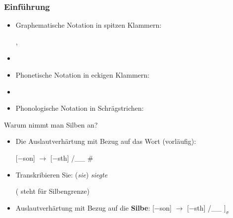 


\begin{frame}
\frametitle{Einführung}


\begin{itemize}
	\item Graphematische Notation in spitzen Klammern: 
	
	  \ea
          , 
          \z
          
	\item[]	
	\item Phonetische Notation in eckigen Klammern:
	
	  \ea
          \textipa{[nO5t.vInt]}
	  \z
          
	\item[]
	\item Phonologische Notation in Schrägstrichen:
	
	  \ea
	  \z
\end{itemize}

\end{frame}



\begin{frame}


Warum nimmt man Silben an?

\begin{itemize}
	\item Die Auslautverhärtung mit Bezug auf das Wort (vorläufig):
	
	  \ea
             {}[$-$son] $\rightarrow$ [$-$sth] /\_\_ \#
	     \z
	\item Transkribieren Sie: (\emph{sie}) \emph{siegte}

\pause	
\ea
\textipa{[zi:k . t@]} ( steht für Silbengrenze)
\z

\pause
	\eal 
	\ex \textipa{[St\textscr e:p.za:m]} \vs \textipa{[St\textscr e:.b5]}
	\ex {} \vs \textipa{[bUn.d@s]}
	\ex \textipa{[bi:k.za:m]} \vs \textipa{[bi:.g@n]}
	\ex \textipa{[le:s.b5]} \vs \textipa{[le:.z@n]}
        \zl
        
	\item Auslautverhärtung mit Bezug auf die \textbf{Silbe}:
	  \ea
             {}[$-$son] $\rightarrow$ [$-$sth] /\_\_ $]_{\sigma}$
	  \z	
\end{itemize}


\end{frame}




